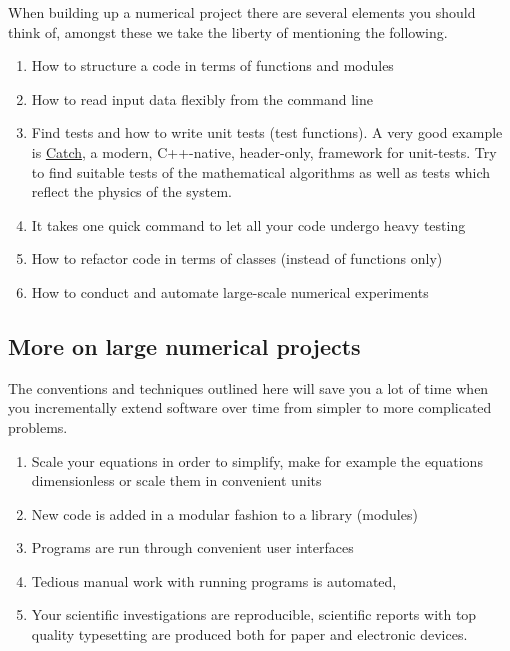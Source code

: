 \documentclass[%
oneside,                 %
final,                   %
10pt]{article}
\begin{document}
When building up a numerical project there are several elements you should think of, amongst these we take the liberty of mentioning the following.
\begin{enumerate}
 \item How to structure a code in terms of functions and modules

 \item How to read input data flexibly from the command line

 \item Find tests and how to write unit tests (test functions). A very good example is \href{{https://github.com/philsquared/Catch}}{Catch}, a modern, C++-native, header-only, framework for unit-tests. Try to find suitable tests of the mathematical algorithms as well as tests which reflect the physics of the system. 

 \item It takes one quick command to let all your code undergo heavy testing

 \item How to refactor code in terms of classes (instead of functions only)

 \item How to conduct and automate large-scale numerical experiments
\end{enumerate}

\noindent
\subsection{More on large numerical projects}
The conventions and techniques outlined here will save you a lot of time when you incrementally extend software over time from simpler to more complicated problems.
\begin{enumerate}
\item Scale your equations in order to simplify, make for example the equations dimensionless or scale them in convenient units

\item New code is added in a modular fashion to a library (modules)

\item Programs are run through convenient user interfaces

\item Tedious manual work with running programs is automated,

\item Your scientific investigations are reproducible, scientific reports with top quality typesetting are produced both for paper and electronic devices.
\end{enumerate}
\end{document}
